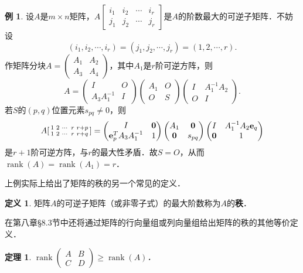 \documentclass[a4paper,fontset=windows]{ctexbook}
\newtheorem{theorem}{定理}[chapter]
\theoremstyle{definition}
\newtheorem{definition}{定义}[chapter]
\newtheorem{example}{例}[chapter]
\DeclareMathOperator{\rank}{rank}
\renewcommand{\ge}{\geqslant}
\begin{document}
\begin{example}
设$A$是$m\times n$矩阵，$A[\begin{smallmatrix}i_1&i_2&\cdots&i_r \\ j_1&j_2&\cdots&j_r\end{smallmatrix}]$是$A$的阶数最大的可逆子矩阵．不妨设
$$(i_1,i_2,\cdots,i_r)=(j_1,j_2,\cdots,j_r)=(1,2,\cdots,r).$$
作矩阵分块$A=\begin{pmatrix}A_1&A_2 \\ A_3&A_4\end{pmatrix}$，其中$A_1$是$r$阶可逆方阵，则
$$A=\begin{pmatrix}I&O \\ A_3A_1^{-1}&I\end{pmatrix}\begin{pmatrix}A_1&O \\ O&S\end{pmatrix}\begin{pmatrix}I&A_1^{-1}A_2 \\ O&I\end{pmatrix}.$$
若$S$的$(p,q)$位置元素$s_{pq}\ne 0$，则
$$A[\begin{smallmatrix}1&2&\cdots&r&r+p \\ 1&2&\cdots&r&r+q\end{smallmatrix}]=\begin{pmatrix}I&{\bf 0} \\ {\bf e}_p^TA_3A_1^{-1}&1\end{pmatrix}\begin{pmatrix}A_1&{\bf 0} \\ {\bf 0}&s_{pq}\end{pmatrix}\begin{pmatrix}I&A_1^{-1}A_2{\bf e}_q \\ {\bf 0}&1\end{pmatrix}$$
是$r+1$阶可逆方阵，与$r$的最大性矛盾．故$S=O$，从而$\rank(A)=\rank(A_1)=r$．
\end{example}

上例实际上给出了矩阵的秩的另一个常见的定义．

\begin{definition}\label{def4.3}
矩阵$A$的可逆子矩阵（或非零子式）的最大阶数称为$A$的{\bf 秩}．
\end{definition}

在第八章\S 8.3节中还将通过矩阵的行向量组或列向量组给出矩阵的秩的其他等价定义．

\begin{theorem}
$\rank\begin{pmatrix}A&B \\ C&D\end{pmatrix}\ge\rank(A)$．
\end{theorem}
\end{document}
